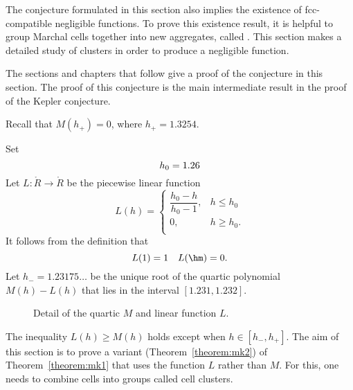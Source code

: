 The conjecture formulated in this section also implies the existence
of fcc-compatible negligible functions.  To prove this existence result, it is
helpful to group Marchal cells together into new aggregates, called
.  This section makes a detailed study of clusters
in order to produce a negligible function.

The sections and chapters that follow give a proof of the
conjecture in this section.  The proof of this conjecture is the
main intermediate result in the proof of the Kepler
conjecture.


Recall that $M(h_+) = 0$, where   $h_+ = 1.3254$.
%

\begin{definition}[$L$,~$h_0$,~$h_-$]\label{def:L} 
Set
\begin{displaymath} 
h_0 = 1.26\\  %
\end{displaymath}
Let $L:\ring{R}\to\ring{R}$ be the piecewise linear function 
\begin{displaymath} 
L(h) = \begin{cases} 
\dfrac{h_0-h}{h_0-1}, & h \le h_0 \\
0, & h\ge h_0. \\
\end{cases}
\end{displaymath}
It follows from the definition that
\begin{displaymath} 
L(1) = 1\quad L(\hm) = 0.
\end{displaymath}
Let $h_- = 1.23175\ldots$ be the unique root of the quartic polynomial
$M(h)-L(h)$ that lies in the interval $[1.231,1.232]$.
%
%
%
\end{definition}

\begin{figure}[htb]
\centering
{}
\caption{Detail of the quartic $M$ and linear function $L$.}
\label{fig:L}
\end{figure}

The inequality $L(h)\ge M(h)$ holds except when $h\in [h_-,h_+]$.  The
aim of this section is to prove a variant (Theorem~\ref{theorem:mk2})
of Theorem~\ref{theorem:mk1}
that uses the function $L$ rather than $M$.  For this, one needs to
combine cells into groups called cell clusters.

